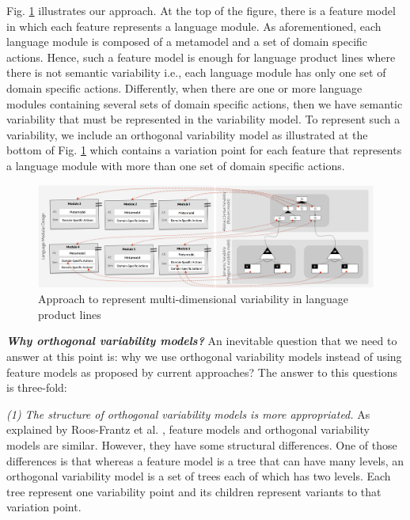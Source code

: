 Fig. \ref{fig:languages-variability-modeling} illustrates our approach. At the top of the figure, there is a feature model in which each feature represents a language module. As aforementioned, each language module is composed of a metamodel and a set of domain specific actions. Hence, such a feature model is enough for language product lines where there is not semantic variability i.e., each language module has only one set of domain specific actions. Differently, when there are one or more language modules containing several sets of domain specific actions, then we have semantic variability that must be represented in the variability model. To represent such a variability, we include an orthogonal variability model as illustrated at the bottom of Fig. \ref{fig:languages-variability-modeling} which contains a variation point for each feature that represents a language module with more than one set of domain specific actions.

\begin{figure}
  \centering\includegraphics[width=1\linewidth]{images/language-variability-fig.png}
  \caption{Approach to represent multi-dimensional variability in language product lines}
  \label{fig:languages-variability-modeling}
\end{figure}

\vspace{2mm}
\textit{\textbf{Why orthogonal variability models?}} An inevitable question that we need to answer at this point is: why we use orthogonal variability models instead of using feature models as proposed by current approaches? The answer to this questions is three-fold:

\vspace{2mm}
\textit{(1) The structure of orthogonal variability models is more appropriated.} As explained by Roos-Frantz et al. \cite{Roos-Frantz:2012}, feature models and orthogonal variability models are similar. However, they have some structural differences. One of those differences is that whereas a feature model is a tree that can have many levels, an orthogonal variability model is a set of trees each of which has two levels. Each tree represent one variability point and its children represent variants to that variation point. 


